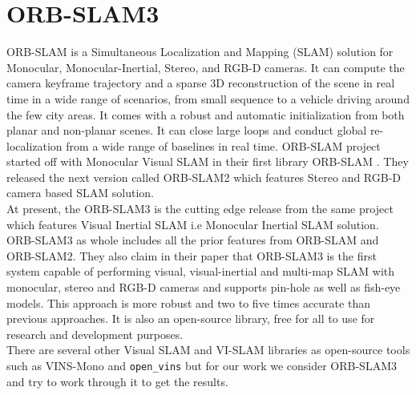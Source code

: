 \section{ORB-SLAM3}
\label{sec:techbg:orbslam3}
ORB-SLAM is a Simultaneous Localization and Mapping (SLAM) solution for Monocular, Monocular-Inertial, Stereo, and RGB-D cameras. It can compute the camera keyframe trajectory and a sparse 3D reconstruction of the scene in real time in a wide range of scenarios, from small sequence to a vehicle driving around the few city areas. It comes with a robust and automatic initialization from both planar and non-planar scenes. It can close large loops and conduct global re-localization from a wide range of baselines in real time. ORB-SLAM project started off with Monocular Visual SLAM in their first library ORB-SLAM \cite{murAcceptedTRO2015}. They released the next version called ORB-SLAM2 \cite{murORB2} which features Stereo and RGB-D camera based SLAM solution. \\

At present, the ORB-SLAM3 \cite{ORBSLAM3_2020} is the cutting edge release from the same project which features Visual Inertial SLAM i.e Monocular Inertial SLAM solution. ORB-SLAM3 as whole includes all the prior features from ORB-SLAM and ORB-SLAM2. They also claim in their paper \cite{ORBSLAM3_2020} that ORB-SLAM3 is the first system capable of performing visual, visual-inertial and multi-map SLAM with monocular, stereo and RGB-D cameras and supports pin-hole as well as fish-eye models.
This approach is more robust and two to five times accurate than previous approaches. It is also an open-source library, free for all to use for research and development purposes. \\

There are several other Visual SLAM and VI-SLAM libraries as open-source tools such as VINS-Mono \cite{Geneva2020ICRA} and \texttt{open\_vins} \cite{qin2017vins} but for our work we consider ORB-SLAM3 and try to work through it to get the results.

